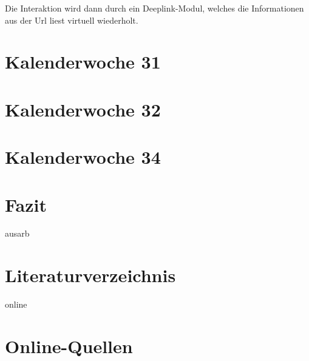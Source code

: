 \documentclass[11pt]{article} %
\begin{document}
Die Interaktion wird dann durch ein Deeplink-Modul, welches die Informationen aus der Url liest virtuell wiederholt.


\section{Kalenderwoche 31} \label{sec:kw3}
\section{Kalenderwoche 32} \label{sec:kw3}
\section{Kalenderwoche 34} \label{sec:kw3}
\section{Fazit} \label{sec:faz}

\newpage


\newpage

\listoffigures %
\listoftables %
%
\begin{btSect}{ausarb}
\section*{Literaturverzeichnis}
\btPrintCited
\end{btSect}
\begin{btSect}{online}
\section*{Online-Quellen}
\btPrintCited
\end{btSect}
\end{document}
